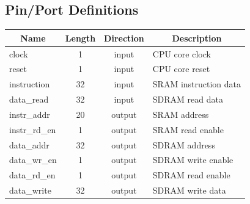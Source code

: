 \documentclass{article}
\begin{document}
 
  \subsection{Pin/Port Definitions}
  \FloatBarrier
  \begin{table}[H]
    \begin{center}
      \begin{tabular}[pos]{| l | c | c | m{7cm} |} \hline 	
      \multicolumn{1}{|c|}{\cellcolor[gray]{0.9}\textbf{Name}} & 
      \multicolumn{1}{c|}{\cellcolor[gray]{0.9}\textbf{Length}} & 
      \multicolumn{1}{c|}{\cellcolor[gray]{0.9}\textbf{Direction}} &
      \multicolumn{1}{c|}{\cellcolor[gray]{0.9}\textbf{Description}} \\ \hline
	 clock 		& 1 	& input 	& CPU core clock  	\\ \hline
	 reset 		& 1	& input		& CPU core reset  	\\ \hline
	 instruction 	& 32	& input 	& SRAM instruction data \\ \hline
	 data\_read 	& 32	& input 	& SDRAM read data \\ \hline
	 instr\_addr 	& 20	& output 	& SRAM address \\ \hline
	 instr\_rd\_en 	& 1	& output 	& SRAM read enable  \\ \hline
	 data\_addr 	& 32	& output	& SDRAM address \\ \hline
	 data\_wr\_en 	& 1	& output 	& SDRAM write enable  \\ \hline
	 data\_rd\_en 	& 1	& output 	& SDRAM read enable  \\ \hline
   data\_write   & 32 & output  & SDRAM write data  \\ \hline
      \end{tabular}
    \end{center}
  \end{table}  

\newpage
\end{document}
